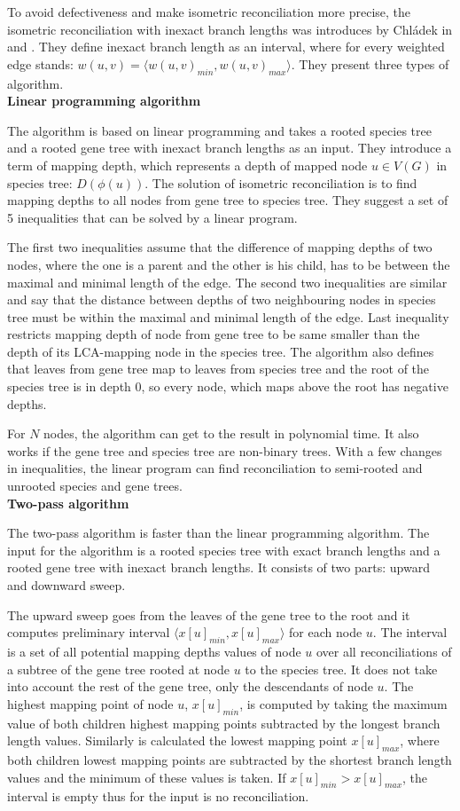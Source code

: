 To avoid defectiveness and make isometric reconciliation more precise, the isometric reconciliation with inexact branch lengths was introduces by Chládek in \cite{chladek_unpublished} and \cite{chladek_thesis}. They define inexact branch length as an interval, where for every weighted edge stands: $w(u, v) = \langle w(u, v)_{min}, w(u, v)_{max} \rangle$. They present three types of algorithm.\\
\textbf{Linear programming algorithm}

The algorithm is based on linear programming and takes a rooted species tree and a rooted gene tree with inexact branch lengths as an input. They introduce a term of mapping depth, which represents a depth of mapped node $u \in V(G)$ in species tree: $D(\phi(u))$. The solution of isometric reconciliation is to find mapping depths to all nodes from gene tree to species tree. They suggest a set of 5 inequalities that can be solved by a linear program.

The first two inequalities assume that the difference of mapping depths of two nodes, where the one is a parent and the other is his child, has to be between the maximal and minimal length of the edge. The second two inequalities are similar and say that the distance between depths of two neighbouring nodes in species tree must be within the maximal and minimal length of the edge. Last inequality restricts mapping depth of node from gene tree to be same smaller than the depth of its LCA-mapping node in the species tree. The algorithm also defines that leaves from gene tree map to leaves from species tree and the root of the species tree is in depth 0, so every node, which maps above the root has negative depths. 

For $N$ nodes, the algorithm can get to the result in polynomial time. It also works if the gene tree and species tree are non-binary trees. With a few changes in inequalities, the linear program can find reconciliation to semi-rooted and unrooted species and gene trees.\\
\textbf{Two-pass algorithm}

The two-pass algorithm is faster than the linear programming algorithm. The input for the algorithm is a rooted species tree with exact branch lengths and a rooted gene tree with inexact branch lengths. It consists of two parts: upward and downward sweep. 

The upward sweep goes from the leaves of the gene tree to the root and it computes preliminary interval $\langle x[u]_{min}, x[u]_{max} \rangle$ for each node $u$. The interval is a set of all potential mapping depths values of node $u$ over all reconciliations of a subtree of the gene tree rooted at node $u$ to the species tree. It does not take into account the rest of the gene tree, only the descendants of node $u$. The highest mapping point of node $u$, $x[u]_{min}$, is computed by taking the maximum value of both children highest mapping points subtracted by the longest branch length values. Similarly is calculated the lowest mapping point $x[u]_{max}$, where both children lowest mapping points are subtracted by the shortest branch length values and the minimum of these values is taken. If $x[u]_{min} > x[u]_{max}$, the interval is empty thus for the input is no reconciliation.

